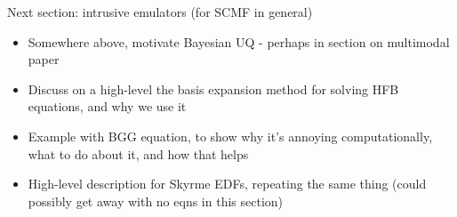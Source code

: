 \documentclass[../thesis.tex]{subfiles}
\begin{document}
Next section: intrusive emulators (for SCMF in general)
\begin{itemize}
	\item Somewhere above, motivate Bayesian UQ - perhaps in section on multimodal paper
	\item Discuss on a high-level the basis expansion method for solving HFB equations, and why we use it
	\item Example with BGG equation, to show why it's annoying computationally, what to do about it, and how that helps
	\item High-level description for Skyrme EDFs, repeating the same thing (could possibly get away with no eqns in this section)
\end{itemize}
\end{document}
